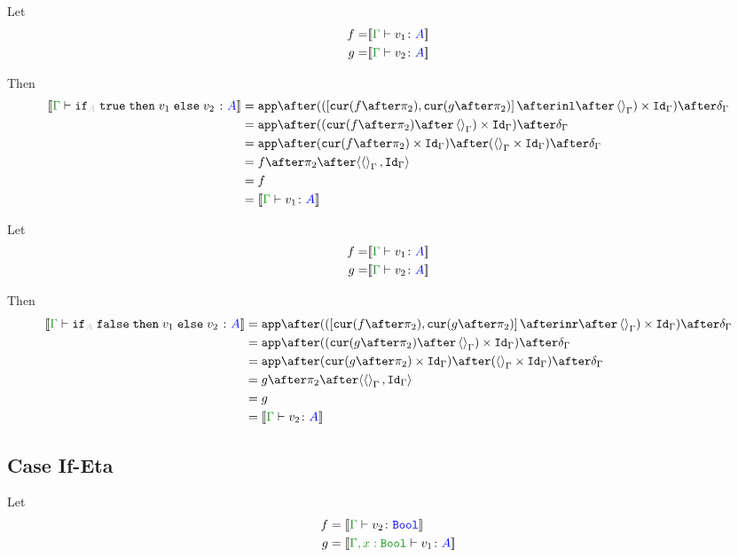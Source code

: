 \documentclass{report}
\begin{document}
Let
\begin{align}
    f = &\deno{\gtyperelation{v_1}{ A}}\\
    g = &\deno{\gtyperelation{v_2}{ A}}\\
\end{align}

Then
\begin{equation}
    \begin{split}
        \deno{\gtyperelation{\pifthenelse{A}{\t}{v_1}{v_2}}{ A}} & = \ifMorph{\inl\after\term{\G}}{f}{g} \\
        & = \app\after((\cur{f\after\pp}\after\term{\G})\times\idg)\after\diag{\G}\\
        & = \app\after(\cur{f\after\pp}\times\idg)\after(\term{\G}\times\idg)\after\diag{\G}\\
        & = f\after\pp\after\pr{\term{\G}}{\idg}\\
        & = f \\
        & = \deno{\gtyperelation{v_1}{ A}}\\
    \end{split}
\end{equation}


Let
\begin{align}
    f = &\deno{\gtyperelation{v_1}{ A}}\\
    g = &\deno{\gtyperelation{v_2}{ A}}\\
\end{align}

Then
\begin{equation}
    \begin{split}
        \deno{\gtyperelation{\pifthenelse{A}{\f}{v_1}{v_2}}{ A}} & = \ifMorph{\inr\after\term{\G}}{f}{g} \\
        & = \app\after((\cur{g\after\pp}\after\term{\G})\times\idg)\after\diag{\G}\\
        & = \app\after(\cur{g\after\pp}\times\idg)\after(\term{\G}\times\idg)\after\diag{\G}\\
        & = g\after\pp\after\pr{\term{\G}}{\idg}\\
        & = g \\
        & = \deno{\gtyperelation{v_2}{ A}}\\
    \end{split}
\end{equation}

\subsection{Case If-Eta}
    Let 
    \begin{align}
        f & = \deno{\typerelation{\G}{v_2}{\B}} \\
        g & = \deno{\typerelation{\G, x: \B}{v_1}{ A}} \\
    \end{align}
\end{document}
